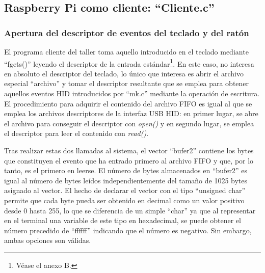 \subsection{Raspberry Pi como cliente: ``Cliente.c''} \label{s3_5_1}

\subsubsection{Apertura del descriptor de eventos del teclado y del ratón}\label{s3_5_1_1}

El programa cliente del taller toma aquello introducido en el teclado mediante ``fgets()'' leyendo el descriptor de la entrada estándar\footnote{Véase el anexo B.}. En este caso, no interesa en absoluto el descriptor del teclado, lo único que interesa es abrir el archivo especial ``archivo'' y tomar el descriptor resultante que se emplea para obtener aquellos eventos HID introducidos por ``mk.c'' mediante la operación de escritura. El procedimiento para adquirir el contenido del archivo FIFO es igual al que se emplea los archivos descriptores de la interfaz USB HID: en primer lugar, se abre el archivo para conseguir el descriptor con {\itshape open()} y en segundo lugar, se emplea el descriptor para leer el contenido con {\itshape read()}. 


Tras realizar estas dos llamadas al sistema, el vector ``bufer2'' contiene los bytes que constituyen el evento que ha entrado primero al archivo FIFO y que, por lo tanto, es el primero en leerse. El número de bytes almacenados en ``bufer2'' es igual al número de bytes leídos independientemente del tamaño  de 1025 bytes asignado al vector. El hecho de declarar el vector con el tipo ``unsigned char'' permite que cada byte pueda ser obtenido en decimal como un valor positivo desde 0 hasta 255, lo que se diferencia de un simple ``char'' ya que al representar en el terminal una variable de este tipo en hexadecimal, se puede obtener el número precedido de ``ffffff'' indicando que el número es negativo. Sin embargo, ambas opciones son válidas.

